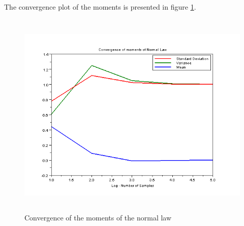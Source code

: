 The convergence plot of the moments is presented in 
figure \ref{introduction_convergencemoments}.

\begin{figure}[htbp]
\begin{center}
\includegraphics[height=10cm]{introduction_convergencemoments.png}
\end{center}
\caption{Convergence of the moments of the normal law}
\label{introduction_convergencemoments}
\end{figure}


